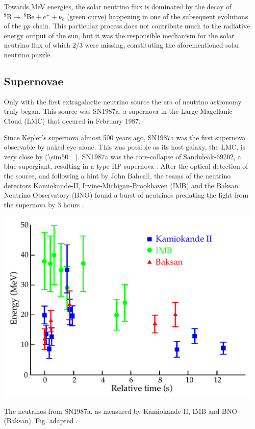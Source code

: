 \documentclass[
    a4paper, %
    fontsize=10pt, %
    twoside=false, %
    numbers=noenddot, %
    fontmethod=tex,
]{kaobook}
\begin{document}
Towards \unit{\mega\eV} energies, the solar neutrino flux is dominated by the decay of $^8\text{B}\rightarrow ~^8\text{Be} + e^+ + \nu_e$ (green curve) happening in one of the subsequent evolutions of the $pp$ chain. This particular process does not contribute much to the radiative energy output of the sun, but it was the responsible mechanism for the solar neutrino flux of which $2/3$ were missing, constituting the aforementioned solar neutrino puzzle.

\subsection{Supernovae} \label{sne}
Only with the first extragalactic neutrino source the era of neutrino astronomy truly began. This source was SN1987a, a supernova in the Large Magellanic Cloud (LMC) that occured in February 1987.

Since Kepler's supernova almost 500 years ago, SN1987a was the first supernova observable by naked eye alone. This was possible as its host galaxy, the LMC, is very close by (\SI{\sim50}{\kilo\parsec}). SN1987a was the core-collapse of Sanduleak-69202, a blue supergiant, resulting in a type IIP supernova . After the optical detection of the source, and following a hint by John Bahcall, the teams of the neutrino detectors Kamiokande-II, Irvine-Michigan-Brookhaven (IMB) and the Baksan Neutrino Observatory (BNO) found a burst of neutrinos predating the light from the supernova by 3 hours .

\begin{marginfigure}
    \includegraphics{theory/sn1987a_flux.pdf}
    \caption[Neutrinos from SN1987a]{The neutrinos from SN1987a, as measured by Kamiokande-II, IMB and BNO (Baksan). Fig. adapted \cite{Grupen2005}.}
\end{marginfigure}
\end{document}
